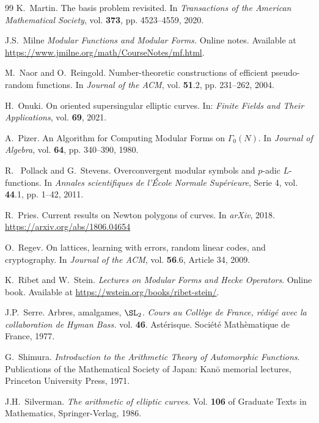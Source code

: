 \documentclass[10pt]{amsart}
\theoremstyle{theostyle}
\newcommand{\GG}{\Gamma}
\begin{document}
\begin{thebibliography}{99}
K.~Martin.
The basis problem revisited.
In {\it Transactions of the American Mathematical Society}, vol. {\bf 373}, pp. 4523--4559, 2020. 

J.S.~Milne
{\it Modular Functions and Modular Forms.}
Online notes. Available at \url{https://www.jmilne.org/math/CourseNotes/mf.html}.

M.~Naor and O.~Reingold.
Number-theoretic constructions of efficient pseudo-random functions. 
In {\it Journal of the ACM}, vol. {\bf51}.2, pp. 231--262, 2004.

H.~Onuki. 
On oriented supersingular elliptic curves. 
In: {\it Finite Fields and Their Applications}, vol. {\bf 69}, 2021.

A.~Pizer. 
An Algorithm for Computing Modular Forms on $\GG_0(N)$.
In {\it Journal of Algebra}, vol. {\bf 64}, pp. 340--390, 1980.

R.~ Pollack and G.~Stevens. 
Overconvergent modular symbols and $p$-adic $L$-functions. 
In {\it Annales scientifiques de l'\'Ecole Normale Sup\'erieure}, Serie 4, vol. {\bf 44}.1, pp. 1--42, 2011.

R.~Pries.
Current results on Newton polygons of curves.
In {\it arXiv}, 2018. \url{https://arxiv.org/abs/1806.04654}

O.~Regev. 
On lattices, learning with errors, random linear codes, and cryptography. 
In {\it Journal of the ACM}, vol. {\bf 56}.6, Article 34, 2009. 

K.~Ribet and W.~Stein.
{\it Lectures on Modular Forms and Hecke Operators}.
Online book. Available at \url{https://wstein.org/books/ribet-stein/}.

J.P.~Serre. 
Arbres, amalgames, $\SL_2$. 
{\it Cours au Coll\`ege de France, r\'edig\'e avec la collaboration de Hyman Bass.} vol. {\bf 46}. Ast\'erisque. Soci\'et\'e Mathèmatique de France, 1977.

G.~Shimura.
{\it Introduction to the Arithmetic Theory of Automorphic Functions}.
Publications of the Mathematical Society of Japan: Kan\={o} memorial lectures, Princeton University Press, 1971.

J.H.~Silverman.
{\it The arithmetic of elliptic curves}.
Vol. {\bf 106} of Graduate Texts in Mathematics, Springer-Verlag, 1986.


\end{thebibliography}
\end{document}
